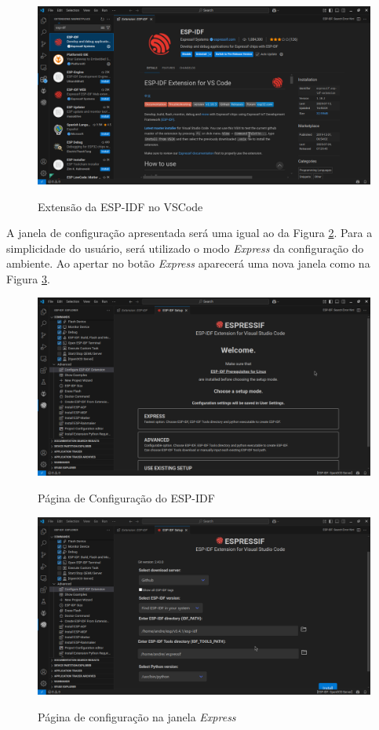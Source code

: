 \begin{figure}[!ht]
    \centering
    \caption{Extensão da ESP-IDF no VSCode}
    \vspace{0.2cm}
    \includegraphics[scale=0.2]{img/VSCodeESP-IDF.png}
    \label{fig:VSCodeESPIDF}
\end{figure}

A janela de configuração apresentada será uma igual ao da Figura
\ref{fig:ESPIDFConfig}. Para a simplicidade do usuário, será
utilizado o modo \textit{Express} da configuração do ambiente.
Ao apertar no botão \textit{Express} aparecerá uma nova janela
como na Figura \ref{fig:ESPIDFConfigExpress}.

\begin{figure}[!ht]
    \centering
    \caption{Página de Configuração do ESP-IDF}
    \vspace{0.2cm}
    \includegraphics[scale=0.2]{img/VSCodeESP-IDF_CONFIGURE.png}
    \label{fig:ESPIDFConfig}
\end{figure}

\begin{figure}[!ht]
    \centering
    \caption{Página de configuração na janela \textit{Express}}
    \vspace{0.2cm}
    \includegraphics[scale=0.2]{img/VSCodeESP-IDF_CONFIGURE_02.png}
    \label{fig:ESPIDFConfigExpress}
\end{figure}